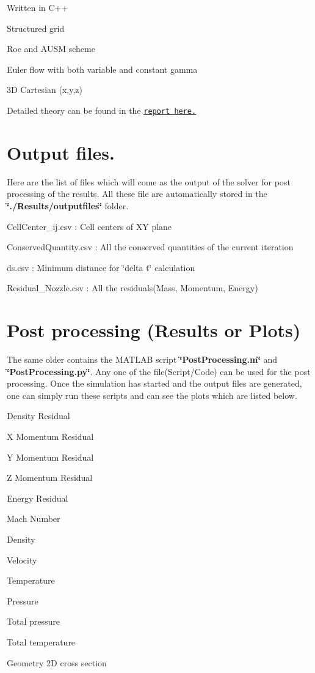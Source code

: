 \begin{DoxyItemize}
\item Written in C++
\item Structured grid
\item Roe and A\+U\+SM scheme
\item Euler flow with both variable and constant gamma
\item 3D Cartesian (x,y,z)
\item Detailed theory can be found in the \href{https://drive.google.com/open?id=0B9x_nh0D_HhzMnBjc0w5MmJpcnc}{\tt report here.}
\end{DoxyItemize}\hypertarget{index_output}{}\section{Output files.}\label{index_output}
Here are the list of files which will come as the output of the solver for post processing of the results. All these file are automatically stored in the {\bfseries \char`\"{}./\+Results/outputfiles\char`\"{}} folder.
\begin{DoxyItemize}
\item Cell\+Center\+\_\+ij.\+csv \+: Cell centers of XY plane
\item Conserved\+Quantity.\+csv \+: All the conserved quantities of the current iteration
\item ds.\+csv \+: Minimum distance for \char`\"{}delta t\char`\"{} calculation
\item Residual\+\_\+\+Nozzle.\+csv \+: All the residuals(\+Mass, Momentum, Energy)
\end{DoxyItemize}\hypertarget{index_plot}{}\section{Post processing (\+Results or Plots)}\label{index_plot}
The same older contains the M\+A\+T\+L\+AB script {\bfseries \char`\"{}\+Post\+Processing.\+m\char`\"{}} and {\bfseries \char`\"{}\+Post\+Processing.\+py\char`\"{}}. Any one of the file(Script/\+Code) can be used for the post processing. Once the simulation has started and the output files are generated, one can simply run these scripts and can see the plots which are listed below.
\begin{DoxyItemize}
\item Density Residual
\item X Momentum Residual
\item Y Momentum Residual
\item Z Momentum Residual
\item Energy Residual
\item Mach Number
\item Density
\item Velocity
\item Temperature
\item Pressure
\item Total pressure
\item Total temperature
\item Geometry 2D cross section 
\end{DoxyItemize}